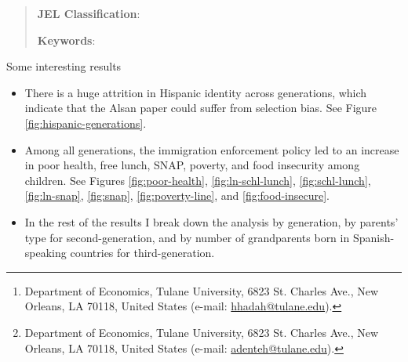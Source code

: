 \documentclass[12pt,english]{article}
\begin{document}
\title{}

\author{\href{https://hussainhadah.com/}{Hussain Hadah}\thanks{Department of Economics, Tulane University, 6823 St. Charles Ave., New Orleans, LA 70118, United States (e-mail: \href{mailto:hhadah@tulane.edu}{hhadah@tulane.edu}).} \quad \href{https://austindenteh.com/}{Augustine Denteh}\thanks{Department of Economics, Tulane University, 6823 St. Charles Ave., New Orleans, LA 70118, United States (e-mail: \href{mailto:adenteh@tulane.edu}{adenteh@tulane.edu}).}}


\maketitle
\begin{abstract}
\singlespacing 

\noindent\textbf{JEL Classification}: 

\noindent\textbf{Keywords}: 

\end{abstract}

\vfill
\pagebreak{}

Some interesting results
\begin{itemize}
  \item There is a huge attrition in Hispanic identity across generations, which indicate that the Alsan paper could suffer from selection bias. See Figure \ref{fig:hispanic-generations}.
  \item Among all generations, the immigration enforcement policy led to an increase in poor health, free lunch, SNAP, poverty, and food insecurity among children. See Figures \ref{fig:poor-health}, \ref{fig:ln-schl-lunch}, \ref{fig:schl-lunch}, \ref{fig:ln-snap}, \ref{fig:snap}, \ref{fig:poverty-line}, and \ref{fig:food-insecure}.
  \item In the rest of the results I break down the analysis by generation, by parents' type for second-generation, and by number of grandparents born in Spanish-speaking countries for third-generation.
\end{itemize}

\pagebreak{}
\end{document}
